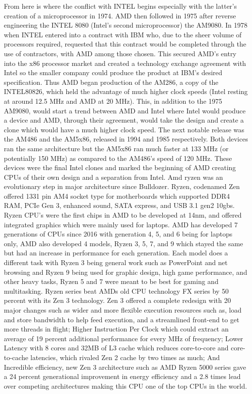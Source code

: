 \documentclass[../computer-history.tex]{subfiles}
\begin{document}
From here is where the conflict with INTEL begins especially with the latter’s creation of a microprocessor in 1974. AMD then followed in 1975 after reverse engineering the INTEL 8080 (Intel’s second microprocessor) the AM9080. In 1978 when INTEL entered into a contract with IBM who, due to the sheer volume of processors required, requested that this contract would be completed through the use of contractors, with AMD among those chosen. This secured AMD’s entry into the x86 processor market and created a technology exchange agreement with Intel so the smaller company could produce the product at IBM’s desired specification. Thus AMD began production of the AM286, a copy of the INTEL80826, which held the advantage of much higher clock speeds (Intel resting at around 12.5 MHz and AMD at 20 MHz). This, in addition to the 1975 AM9080, would start a trend between AMD and Intel where Intel would produce a device and AMD, through their agreement, would take the design and create a clone which would have a much higher clock speed. The next notable release was the AM486 and the AM5x86, released in 1994 and 1985 respectively. Both devices ran the same architecture but the AM5x86 ran much faster at 133 MHz (or potentially 150 MHz) as compared to the AM486’s speed of 120 MHz. These devices were the final Intel clones and marked the beginning of AMD creating CPUs of their own design and a separation from Intel. %
\cite{Ryzen}Amd ryzen was an evolutionary step in major architecture since Bulldozer. Ryzen, codenamed Zen offered 1331 pin AM4 socket type for motherboards which supported DDR4 RAM, PCIe Gen 3, enhanced sound, SATA express, and USB 3.1 gen2 10gbs. Ryzen CPU's were the first chips in AMD to be developed at 14nm, and offered integrated graphics which were mainly used for laptops.\cite{Ryzen2} AMD has developed 7 generations of CPUs since 2016 with generation 4, 5, and 6 being for laptops only, AMD also developed 4 models, Ryzen 3, 5, 7, and 9 which stayed the same but had an increase in performance for each generation. Each model does a different task with Ryzen 3 being general work such as PowerPoint and net browsing and Ryzen 9 being used for graphic design, high game performance, and other heavy tasks, Ryzen 5 and 7 were meant to be best for gaming and multitasking.\cite{Ryzen3} Ryzen series beat AMDs old CPU technology FX series by 50 percent with its Zen 3 technology.\cite{Ryzen4} Zen 3 offered a complete redesign with 20 major changes such as wider and more flexible execution resources such as, load and store bandwidth to help feed execution, and 
a streamlined front-end to get more threads in flight; Higher Instruction Per Clock which could extract an average of 19 percent additional performance for every MHz of frequency; Lower Latency with 8 cores and 32MB of L3 cache which reduces core-to-core and core-to-cache latencies, which rivaled Zen 2 cache by two times as much; And Incredible efficiency, new Zen 3 architecture such as AMD Ryzen 5000 series gave a 24 percent generational improvement in energy efficiency 
and a 2.8 times lead over competing architectures making this CPU one of the top CPUs in the world.
\end{document}
